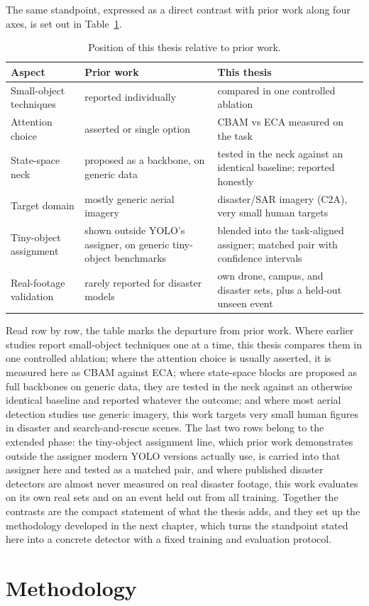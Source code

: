 \documentclass[12pt,a4paper,oneside]{report}
\begin{document}
The same standpoint, expressed as a direct contrast with prior work along four
axes, is set out in Table~\ref{tab:gap}.

\begin{table}[tbp]
  \centering
  \caption{Position of this thesis relative to prior work.}
  \label{tab:gap}
  \small
  \setlength{\tabcolsep}{5pt}
  \renewcommand{\arraystretch}{1.15}
  \begin{tabular}{@{}
    >{\raggedright\arraybackslash}p{3.8cm}
    >{\raggedright\arraybackslash}p{4.7cm}
    >{\raggedright\arraybackslash}p{4.7cm}@{}}
    \toprule
    Aspect & Prior work & This thesis \\
    \midrule
    Small-object techniques & reported individually & compared in one controlled ablation \\
    Attention choice & asserted or single option & CBAM vs ECA measured on the task \\
    State-space neck & proposed as a backbone, on generic data & tested in the neck against an identical baseline; reported honestly \\
    Target domain & mostly generic aerial imagery & disaster/SAR imagery (C2A), very small human targets \\
    Tiny-object assignment & shown outside YOLO's assigner, on generic tiny-object benchmarks & blended into the task-aligned assigner; matched pair with confidence intervals \\
    Real-footage validation & rarely reported for disaster models & own drone, campus, and disaster sets, plus a held-out unseen event \\
    \bottomrule
  \end{tabular}
\end{table}

Read row by row, the table marks the departure from prior work. Where earlier
studies report small-object techniques one at a time, this thesis compares them
in one controlled ablation; where the attention choice is usually asserted, it
is measured here as CBAM against ECA; where state-space blocks are proposed as
full backbones on generic data, they are tested in the neck against an
otherwise identical baseline and reported whatever the outcome; and where most
aerial detection studies use generic imagery, this work targets very small
human figures in disaster and search-and-rescue scenes. The last two rows
belong to the extended phase: the tiny-object assignment line, which prior
work demonstrates outside the assigner modern YOLO versions actually use, is
carried into that assigner here and tested as a matched pair, and where
published disaster detectors are almost never measured on real disaster
footage, this work evaluates on its own real sets and on an event held out
from all training. Together the contrasts are the compact statement of what
the thesis adds, and they set up the methodology developed in the next
chapter, which turns the standpoint stated here into a concrete detector with
a fixed training and evaluation protocol.
 \newpage 
 \newpage \chapter{Methodology}
\end{document}
